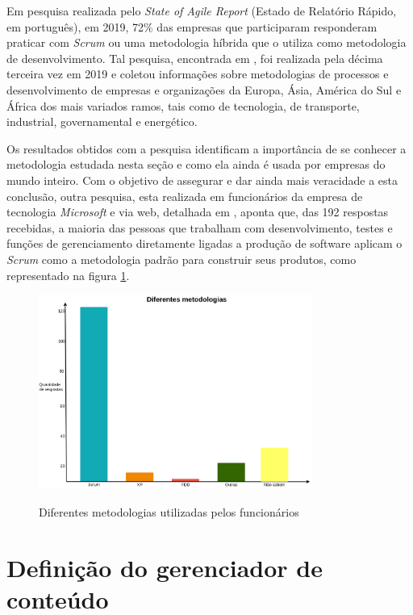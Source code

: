 Em pesquisa realizada pelo \textit{State of Agile Report} (Estado de Relatório Rápido, em português), em 2019, 72\% das empresas que participaram responderam praticar com \textit{Scrum} ou uma metodologia híbrida que o utiliza como metodologia de desenvolvimento. Tal pesquisa, encontrada em , foi realizada pela décima terceira vez em 2019 e coletou informações sobre metodologias de processos e desenvolvimento de empresas e organizações da Europa, Ásia, América do Sul e África dos mais variados ramos, tais como de tecnologia, de transporte, industrial, governamental e energético.

Os resultados obtidos com a pesquisa identificam a importância de se conhecer a metodologia estudada nesta seção e como ela ainda é usada por empresas do mundo inteiro. Com o objetivo de assegurar e dar ainda mais veracidade a esta conclusão, outra pesquisa, esta realizada em funcionários da empresa de tecnologia \textit{Microsoft} e via web, detalhada em , aponta que, das 192 respostas recebidas, a maioria das pessoas que trabalham com desenvolvimento, testes e funções de gerenciamento diretamente ligadas a produção de software aplicam o \textit{Scrum} como a metodologia padrão para construir seus produtos, como representado na figura \ref{ageis-microsoft}. 

\begin{figure}[htb]
 \centering
 \caption{Diferentes metodologias utilizadas pelos funcionários}
 \includegraphics[width=0.8\textwidth]{figuras/diferentes-metodologias}
 \label{ageis-microsoft}
\end{figure}


\hspace{2.5cm}
\section{Definição do gerenciador de conteúdo}
\label{sec:defCMS}

